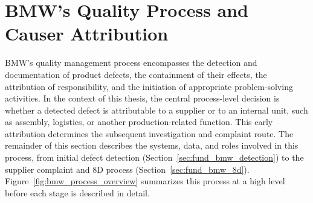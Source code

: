 \section{BMW's Quality Process and Causer Attribution}\label{sec:fund_bmw}

BMW's quality management process encompasses the detection and
documentation of product defects, the containment of their effects, the
attribution of responsibility, and the initiation of appropriate
problem-solving activities. In the context of this thesis, the central
process-level decision is whether a detected defect is attributable to a
supplier or to an internal unit, such as assembly, logistics, or another
production-related function. This early attribution determines the
subsequent investigation and complaint route. The remainder of this
section describes the systems, data, and roles involved in this process,
from initial defect detection (Section~\ref{sec:fund_bmw_detection}) to
the supplier complaint and 8D process (Section~\ref{sec:fund_bmw_8d}).
Figure~\ref{fig:bmw_process_overview} summarizes this process at a high
level before each stage is described in detail.

